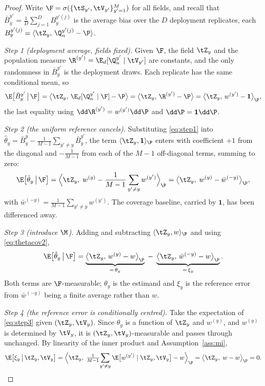 \begin{proof}
Write $\F = \sigma(\{\tS_{y'}, \tV_{y'}\}_{y'=1}^M)$ for all fields, and recall
that $\bar B_y^{y'} = \frac1D\sum_{j=1}^D B_y^{y'(j)}$ is the average bias over the
$D$ deployment replicates, each
$B_y^{y'(j)} = \langle \tZ_y,\, \Q_n^{y'(j)} - \P\rangle$.

\emph{Step 1 (deployment average, fields fixed).} Given $\F$, the field $\tZ_y$
and the population measure $\R^{(y')} = \E_d[\Q_n^{y'} \mid \tV_{y'}]$ are
constants, and the only randomness in $\bar B_y^{y'}$ is the deployment draws.
Each replicate has the same conditional mean, so
\begin{equation}
  \label{eq:step1}
  \E\big[\bar B_y^{y'} \,\big|\, \F\big]
  = \big\langle \tZ_y,\, \E_d[\Q_n^{y'} \mid \F] - \P\big\rangle
  = \big\langle \tZ_y,\, \R^{(y')} - \P\big\rangle
  = \big\langle \tZ_y,\, w^{(y')} - \mathbf{1}\big\rangle_\P ,
\end{equation}
the last equality using $\dd\R^{(y')} = w^{(y')}\dd\P$ and $\dd\P = \mathbf{1}\dd\P$.

\emph{Step 2 (the uniform reference cancels).} Substituting \eqref{eq:step1} into
$\hat\theta_y = \bar B_y^{y} - \frac{1}{M-1}\sum_{y'\neq y}\bar B_y^{y'}$, the
term $\langle \tZ_y, \mathbf 1\rangle_\P$ enters with coefficient $+1$ from the
diagonal and $-\frac{1}{M-1}$ from each of the $M-1$ off-diagonal terms, summing
to zero:
\begin{equation}
  \label{eq:step2}
  \E\big[\hat\theta_y \,\big|\, \F\big]
  = \Big\langle \tZ_y,\; w^{(y)} - \frac{1}{M-1}\sum_{y'\neq y} w^{(y')}\Big\rangle_\P
  = \big\langle \tZ_y,\; w^{(y)} - \bar w^{(-y)}\big\rangle_\P ,
\end{equation}
with $\bar w^{(-y)} = \frac{1}{M-1}\sum_{y'\neq y} w^{(y')}$. The coverage
baseline, carried by $\mathbf 1$, has been differenced away.

\emph{Step 3 (introduce $\M$).} Adding and subtracting $\langle \tZ_y, w\rangle_\P$
and using \eqref{eq:thetacov2},
\begin{equation}
  \label{eq:step3}
  \E\big[\hat\theta_y \,\big|\, \F\big]
  = \underbrace{\big\langle \tZ_y,\, w^{(y)} - w\big\rangle_\P}_{=\,\theta_y}
  \;-\; \underbrace{\big\langle \tZ_y,\, \bar w^{(-y)} - w\big\rangle_\P}_{=\,\xi_y} .
\end{equation}
Both terms are $\F$-measurable; $\theta_y$ is the estimand and $\xi_y$ is the
reference error from $\bar w^{(-y)}$ being a finite average rather than $w$.

\emph{Step 4 (the reference error is conditionally centred).} Take the
expectation of \eqref{eq:step3} given $(\tZ_y, \tV_y)$. Since $\theta_y$ is a
function of $\tZ_y$ and $w^{(y)}$, and $w^{(y)}$ is determined by $\tV_y$, it is
$(\tZ_y,\tV_y)$-measurable and passes through unchanged. By linearity of the
inner product and Assumption~\ref{ass:mi},
\begin{equation}
  \E\big[\xi_y \,\big|\, \tZ_y, \tV_y\big]
  = \Big\langle \tZ_y,\; \tfrac{1}{M-1}\!\sum_{y'\neq y}
     \E\big[w^{(y')} \mid \tZ_y, \tV_y\big] - w\Big\rangle_\P
  = \big\langle \tZ_y,\; w - w\big\rangle_\P
  = 0 .
\end{equation}


\end{proof}
